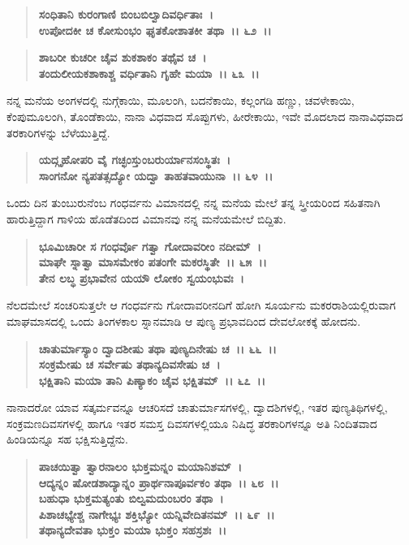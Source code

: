 \begin{verse}
\textbf{ಸಂಧಿತಾನಿ ಕುರಂಗಾಣಿ ಬಿಂಬಬಿಲ್ವಾದಿವರ್ಧಿತಾಃ~।}\\\textbf{ಉಪೋದಕೀ ಚ ಕೋಸುಂಭಂ ಘೃತಕೋಶಾತಕೀ ತಥಾ~।। ೬೨~।।}
\end{verse}

\begin{verse}
\textbf{ಶಾಬರೀ ಕುಚರೀ ಚೈವ ಶುಕಶಾಕಂ ತಥೈವ ಚ~।}\\\textbf{ತಂದುಲೀಯಕಶಾಕಾಶ್ಚ ವರ್ಧಿತಾನಿ ಗೃಹೇ ಮಯಾ~।। ೬೩~।।}
\end{verse}

ನನ್ನ ಮನೆಯ ಅಂಗಳದಲ್ಲಿ ನುಗ್ಗೆಕಾಯಿ, ಮೂಲಂಗಿ, ಬದನೆಕಾಯಿ, ಕಲ್ಲಂಗಡಿ ಹಣ್ಣು, ಚವಳೇಕಾಯಿ, ಕೆಂಪುಮೂಲಂಗಿ, ತೊಂಡೆಕಾಯಿ, ನಾನಾ ವಿಧವಾದ ಸೊಪ್ಪುಗಳು, ಹೀರೇಕಾಯಿ, ಇವೇ ಮೊದಲಾದ ನಾನಾವಿಧವಾದ ತರಕಾರಿಗಳನ್ನು ಬೆಳೆಯುತ್ತಿದ್ದೆ.

\begin{verse}
\textbf{ಯದ್ಗೃಹೋಪರಿ ವೈ ಗಚ್ಛಂಸ್ತುಂಬರುರ್ಯಾನಸಂಸ್ಥಿತಃ~।}\\\textbf{ಸಾಂಗನೋ ನ್ಯಪತತ್ಸದ್ಯೋ ಯದ್ವಾ ತಾಹತವಾಯುನಾ~।। ೬೪~।।}
\end{verse}

ಒಂದು ದಿನ ತುಂಬುರುನೆಂಬ ಗಂಧರ್ವನು ವಿಮಾನದಲ್ಲಿ ನನ್ನ ಮನೆಯ ಮೇಲೆ ತನ್ನ ಸ್ತ್ರೀಯರಿಂದ ಸಹಿತನಾಗಿ ಹಾರುತ್ತಿದ್ದಾಗ ಗಾಳಿಯ ಹೊಡೆತದಿಂದ ವಿಮಾನವು ನನ್ನ ಮನೆಯಮೇಲೆ ಬಿದ್ದಿತು.

\begin{verse}
\textbf{ಭೂಮಿಚಾರೀ ಸ ಗಂಧರ್ವೊ ಗತ್ವಾ ಗೋದಾವರೀಂ ನದೀಮ್~।}\\\textbf{ಮಾಘೇ ಸ್ನಾತ್ವಾ ಮಾಸಮೇಕಂ ಪತಂಗೇ ಮಕರಸ್ಥಿತೇ~।। ೬೫~।। }\\\textbf{ತೇನ ಲಬ್ಧ ಪ್ರಭಾವೇನ ಯಯೌ ಲೋಕಂ ಸ್ವಯಂಭುವಃ~।}
\end{verse}

ನೆಲದಮೇಲೆ ಸಂಚರಿಸುತ್ತಲೇ ಆ ಗಂಧರ್ವನು ಗೋದಾವರೀನದಿಗೆ ಹೋಗಿ ಸೂರ್ಯನು ಮಕರರಾಶಿಯಲ್ಲಿರುವಾಗ ಮಾಘಮಾಸದಲ್ಲಿ ಒಂದು ತಿಂಗಳಕಾಲ ಸ್ನಾನಮಾಡಿ ಆ ಪುಣ್ಯ ಪ್ರಭಾವದಿಂದ ದೇವಲೋಕಕ್ಕೆ ಹೋದನು.

\begin{verse}
\textbf{ಚಾತುರ್ಮಾಸ್ಯಾಂ ದ್ವಾದಶೀಷು ತಥಾ ಪುಣ್ಯದಿನೇಷು ಚ~।। ೬೬~।।}\\\textbf{ಸಂಕ್ರಮೇಷು ಚ ಸರ್ವೇಷು ತಥಾನ್ಯದಿವಸೇಷು ಚ~। }\\\textbf{ಭಕ್ಷಿತಾನಿ ಮಯಾ ತಾನಿ ಪಿಣ್ಯಾಕಂ ಚೈವ ಭಕ್ಷಿತಮ್~।। ೬೭~।।}
\end{verse}

ನಾನಾದರೋ ಯಾವ ಸತ್ಕರ್ಮವನ್ನೂ ಆಚರಿಸದೆ ಚಾತುರ್ಮಾಸಗಳಲ್ಲಿ, ದ್ವಾದಶಿಗಳಲ್ಲಿ, ಇತರ ಪುಣ್ಯತಿಥಿಗಳಲ್ಲಿ, ಸಂಕ್ರಮಣದಿವಸಗಳಲ್ಲಿ ಹಾಗೂ ಇತರ ಸಮಸ್ತ ದಿವಸಗಳಲ್ಲಿಯೂ ನಿಷಿದ್ಧ ತರಕಾರಿಗಳನ್ನೂ ಅತಿ ನಿಂದಿತವಾದ ಹಿಂಡಿಯನ್ನೂ ಸಹ ಭಕ್ಷಿಸುತ್ತಿದ್ದೆನು.

\begin{verse}
\textbf{ಪಾಚಯಿತ್ವಾ ತ್ವಾರನಾಲಂ ಭುಕ್ತಮನ್ನಂ ಮಯಾನಿಶಮ್~।}\\\textbf{ಆದ್ಯನ್ನಂ ಷೋಡಶಾದ್ಯಾನ್ನಂ ಪ್ರಾರ್ಥನಾಪೂರ್ವಕಂ ತಥಾ~।। ೬೮~।। }\\\textbf{ಬಹುಧಾ ಭುಕ್ತಮತ್ಯಂತು ಬಿಲ್ವಮದುಂಬರಂ ತಥಾ~।}\\\textbf{ಪಿಶಾಚಭ್ಯೇಶ್ಚ ನಾಗೇಭ್ಯಃ ಶಕ್ತಿಭ್ಯೋ ಯನ್ನಿವೇದಿತನಮ್~।। ೬೯~।।} \\\textbf{ತಥಾನ್ಯದೇವತಾ ಭುಕ್ತಂ ಮಯಾ ಭುಕ್ತಂ ಸಹಸ್ರಶಃ~।।}
\end{verse}

